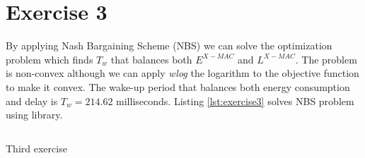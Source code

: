 \documentclass[12pt, a4paper]{article}
\begin{document}
\section*{Exercise 3}%
\label{sec:exercise3}

By applying Nash Bargaining Scheme (NBS) we can solve the optimization problem which finds $T_{w}$ that balances both $E^{X-MAC}$ and $L^{X-MAC}$. The problem is non-convex although we can apply \textit{wlog} the logarithm to the objective function to make it convex. The wake-up period that balances both energy consumption and delay is $T_{w} = 214.62$ milliseconds. Listing \ref{lst:exercise3} solves NBS problem using  library.

\begin{listing}[H]
  \inputminted[firstline=183, lastline=214, breaklines=true,fontsize=\footnotesize]{python}{../code/main.py}
  \caption{Third exercise}
  \label{lst:exercise3}
\end{listing}

% 
% 
\end{document}
